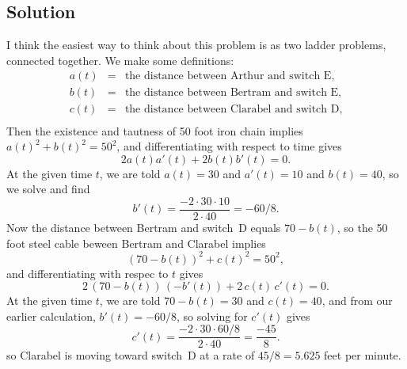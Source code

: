 \documentclass[12pt]{article}
\newcounter{problem}
\begin{document}
\begin{solution}
\subsection*{Solution}
I think the easiest way to think about this problem is as two ladder
problems, connected together.  We make some definitions:
\begin{eqnarray*}
a(t) &=& \mbox{the distance between Arthur and switch~E,} \\
b(t) &=& \mbox{the distance between Bertram and switch~E,} \\
c(t) &=& \mbox{the distance between Clarabel and switch~D,} \\
\end{eqnarray*}
Then the existence and tautness of 50 foot iron chain implies $a(t)^2
+ b(t)^2 = 50^2$, and differentiating with respect to time gives
$$
2 a(t) a'(t) + 2 b(t) b'(t) = 0.
$$
At the given time $t$, we are told $a(t) = 30$ and $a'(t) = 10$ and
$b(t) = 40$, so we solve and find
$$
b'(t) = \frac{- 2 \cdot 30 \cdot 10}{2 \cdot 40} = -60/8.
$$
Now the distance between Bertram and switch~D equals $70 - b(t)$,
so the 50 foot steel cable beween Bertram and Clarabel implies
$$
(70 - b(t))^2 + c(t)^2 = 50^2,
$$
and differentiating with respec to $t$ gives
$$
2 \, (70 - b(t)) \, (-b'(t)) + 2 \, c(t) \, c'(t) = 0.
$$
At the given time $t$, we are told $70 - b(t) = 30$ and $c(t) = 40$, and from our earlier calculation, $b'(t) = - 60/8$, so solving for $c'(t)$ gives
$$
c'(t) = \frac{-2 \cdot 30 \cdot 60 / 8}{2 \cdot 40} = \frac{-45}{8}.
$$
so Clarabel is moving toward switch~D at a rate of $45/8 = 5.625$
feet per minute.
\end{solution}
\end{document}

